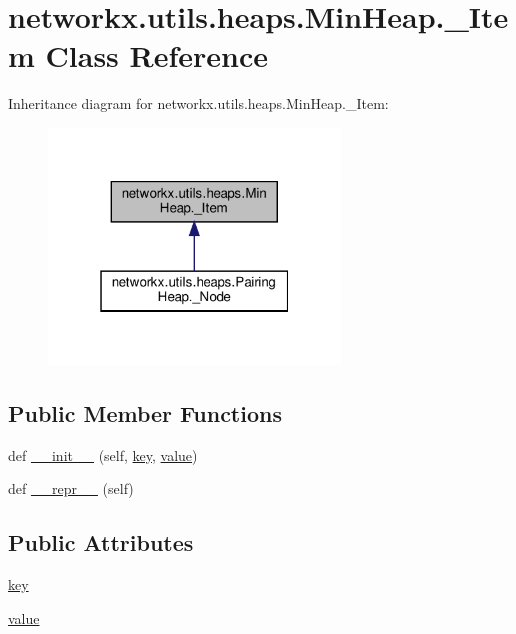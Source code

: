 \hypertarget{classnetworkx_1_1utils_1_1heaps_1_1MinHeap_1_1__Item}{}\section{networkx.\+utils.\+heaps.\+Min\+Heap.\+\_\+\+Item Class Reference}
\label{classnetworkx_1_1utils_1_1heaps_1_1MinHeap_1_1__Item}


Inheritance diagram for networkx.\+utils.\+heaps.\+Min\+Heap.\+\_\+\+Item\+:
\nopagebreak
\begin{figure}[H]
\begin{center}
\leavevmode
\includegraphics[width=220pt]{classnetworkx_1_1utils_1_1heaps_1_1MinHeap_1_1__Item__inherit__graph}
\end{center}
\end{figure}
\subsection*{Public Member Functions}
\begin{DoxyCompactItemize}
\item 
def \hyperlink{classnetworkx_1_1utils_1_1heaps_1_1MinHeap_1_1__Item_a14353f2d1d8e741557568fd491908ce1}{\+\_\+\+\_\+init\+\_\+\+\_\+} (self, \hyperlink{classnetworkx_1_1utils_1_1heaps_1_1MinHeap_1_1__Item_a9cdd431494aecd5f17b02a77c3651ae7}{key}, \hyperlink{classnetworkx_1_1utils_1_1heaps_1_1MinHeap_1_1__Item_ad83888d62604e8d9ccd16ccc84846f80}{value})
\item 
def \hyperlink{classnetworkx_1_1utils_1_1heaps_1_1MinHeap_1_1__Item_acc298bc99233145f777ff88aad4e695e}{\+\_\+\+\_\+repr\+\_\+\+\_\+} (self)
\end{DoxyCompactItemize}
\subsection*{Public Attributes}
\begin{DoxyCompactItemize}
\item 
\hyperlink{classnetworkx_1_1utils_1_1heaps_1_1MinHeap_1_1__Item_a9cdd431494aecd5f17b02a77c3651ae7}{key}
\item 
\hyperlink{classnetworkx_1_1utils_1_1heaps_1_1MinHeap_1_1__Item_ad83888d62604e8d9ccd16ccc84846f80}{value}
\end{DoxyCompactItemize}


